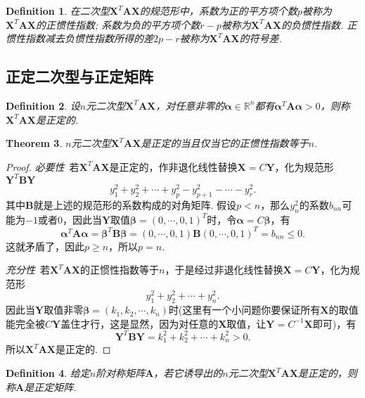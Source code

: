 \documentclass{article}
\newtheorem{theorem}{Theorem}[section]
\newtheorem{definition}[theorem]{Definition}
\newcommand{\mbf}[1]{\bm{#1}}
\begin{document}
\begin{definition}
\rm  在二次型$\mbf{X}^T\mbf{A}\mbf{X}$的规范形中，系数为正的平方项个数$p$被称为$\mbf{X}^T\mbf{A}\mbf{X}$的{\color{red}正惯性指数}; 系数为负的平方项个数$r-p$被称为$\mbf{X}^T\mbf{A}\mbf{X}$的{\color{red}负惯性指数}. 正惯性指数减去负惯性指数所得的差$2p-r$被称为$\mbf{X}^T\mbf{A}\mbf{X}$的{\color{red}符号差}.
\end{definition}


\subsection{正定二次型与正定矩阵}

\begin{definition}
\rm 设$n$元二次型$\mbf{X}^T\mbf{A}\mbf{X}$，对任意非零的$\mbf{\alpha} \in \mathbb{R}^n$都有$\mbf{\alpha}^T \mbf{A} \mbf{\alpha} > 0$，则称$\mbf{X}^T\mbf{A}\mbf{X}$是{\color{red}正定}的.
\end{definition}

\begin{theorem}
\rm $n$元二次型$\mbf{X}^T\mbf{A}\mbf{X}$是正定的当且仅当它的正惯性指数等于$n$.  
\end{theorem}

\begin{proof}
\rm \emph{必要性}\ 若$\mbf{X}^T\mbf{A}\mbf{X}$是正定的，作非退化线性替换$\mbf{X}=C\mbf{Y}$，化为规范形$\mbf{Y}^T\mbf{B}\mbf{Y}$
$$
y_1 ^2 + y_2^2 + \cdots + y_p^2 - y_{p+1}^2 -\cdots -y_r^2.
$$
其中$\mbf{B}$就是上述的规范形的系数构成的对角矩阵. 假设$p < n$，那么$y_n^2$的系数$b_{nn}$可能为$-1$或者$0$，因此当$\mbf{Y}$取值$\mbf{\beta} = (0,\cdots,0,1)^T$时，令$\mbf{\alpha} = C\mbf{\beta}$，有
$$
\mbf{\alpha}^T\mbf{A}\mbf{\alpha} = \mbf{\beta}^T\mbf{B}\mbf{\beta} = (0,\cdots,0,1) \mbf{B} (0,\cdots,0,1)^T = b_{nn} \leq 0. 
$$
这就矛盾了，因此$p \geq  n$，所以$p = n$.

\emph{充分性}\ 若$\mbf{X}^T\mbf{A}\mbf{X}$的正惯性指数等于$n$，于是经过非退化线性替换$\mbf{X} = C\mbf{Y}$，化为规范形
$$
y_1^2 + y_2^2 + \cdots + y_n^2.
$$
因此当$\mbf{Y}$取值非零$\mbf{\beta}=(k_1,k_2,\cdots,k_n)$时(这里有一个小问题你要保证所有$\mbf{X}$的取值能完全被$C\mbf{Y}$盖住才行，这是显然，因为对任意的$\mbf{X}$取值，让$\mbf{Y}=C^{-1}\mbf{X} $即可)，有
$$
\mbf{Y}^T\mbf{B}\mbf{Y} = k_1^2 + k_2^2 + \cdots + k_n^2 > 0.
$$
所以$\mbf{X}^T\mbf{A}\mbf{X}$是正定的. 
\end{proof}

\begin{definition}
\rm 给定$n$阶对称矩阵$\mbf{A}$，若它诱导出的$n$元二次型$\mbf{X}^T\mbf{A}\mbf{X}$是正定的，则称$\mbf{A}$是{\color{red}正定矩阵}.
\end{definition}
\end{document}

